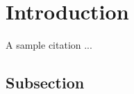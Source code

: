\section{Introduction}\label{sec::introduction}
A sample citation ... \cite{nakamoto2008bitcoin}
\subsection{Subsection}
